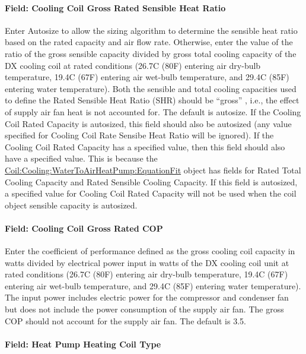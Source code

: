 \paragraph{Field: Cooling Coil Gross Rated Sensible Heat Ratio}\label{field-cooling-coil-gross-rated-sensible-heat-ratio-2}

Enter Autosize to allow the sizing algorithm to determine the sensible heat ratio based on the rated capacity and air flow rate. Otherwise, enter the value of the ratio of the gross sensible capacity divided by gross total cooling capacity of the DX cooling coil at rated conditions (26.7C (80F) entering air dry-bulb temperature, 19.4C (67F) entering air wet-bulb temperature, and 29.4C (85F) entering water temperature). Both the sensible and total cooling capacities used to define the Rated Sensible Heat Ratio (SHR) should be ``gross'' , i.e., the effect of supply air fan heat is not accounted for. The default is autosize. If the Cooling Coil Rated Capacity is autosized, this field should also be autosized (any value specified for Cooling Coil Rate Sensibe Heat Ratio will be ignored). If the Cooling Coil Rated Capacity has a specified value, then this field should also have a specified value. This is because the \hyperref[coilcoolingwatertoairheatpumpequationfit]{Coil:Cooling:WaterToAirHeatPump:EquationFit} object has fields for Rated Total Cooling Capacity and Rated Sensible Cooling Capacity. If this field is autosized, a specified value for Cooling Coil Rated Capacity will not be used when the coil object sensible capacity is autosized.

\paragraph{Field: Cooling Coil Gross Rated COP}\label{field-cooling-coil-gross-rated-cop-1}

Enter the coefficient of performance defined as the gross cooling coil capacity in watts divided by electrical power input in watts of the DX cooling coil unit at rated conditions (26.7C (80F) entering air dry-bulb temperature, 19.4C (67F) entering air wet-bulb temperature, and 29.4C (85F) entering water temperature). The input power includes electric power for the compressor and condenser fan but does not include the power consumption of the supply air fan. The gross COP should not account for the supply air fan. The default is 3.5.

\paragraph{Field: Heat Pump Heating Coil Type}\label{field-heat-pump-heating-coil-type-1}

